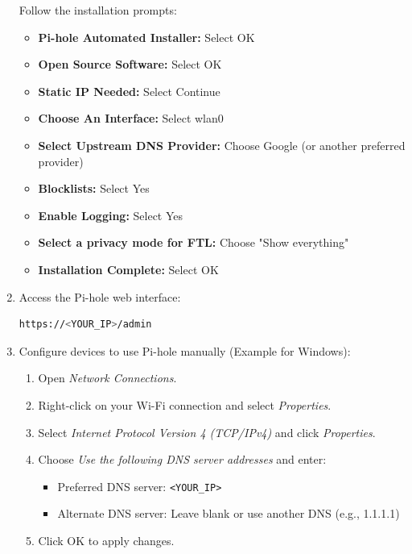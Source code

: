 \documentclass[a4paper,12pt]{article}
\begin{document}
\begin{enumerate}
    Follow the installation prompts:
    \begin{itemize}
        \item \textbf{Pi-hole Automated Installer:} Select OK
        \item \textbf{Open Source Software:} Select OK
        \item \textbf{Static IP Needed:} Select Continue
        \item \textbf{Choose An Interface:} Select wlan0
        \item \textbf{Select Upstream DNS Provider:} Choose Google (or another preferred provider)
        \item \textbf{Blocklists:} Select Yes
        \item \textbf{Enable Logging:} Select Yes
        \item \textbf{Select a privacy mode for FTL:} Choose "Show everything"
        \item \textbf{Installation Complete:} Select OK
    \end{itemize}

    \item Access the Pi-hole web interface:
    \begin{lstlisting}[language=bash, breaklines=true, breakatwhitespace=true, columns=fullflexible]
    https://<YOUR_IP>/admin
    \end{lstlisting}

    \item Configure devices to use Pi-hole manually (Example for Windows):
    \begin{enumerate}
        \item Open \textit{Network Connections}.
        \item Right-click on your Wi-Fi connection and select \textit{Properties}.
        \item Select \textit{Internet Protocol Version 4 (TCP/IPv4)} and click \textit{Properties}.
        \item Choose \textit{Use the following DNS server addresses} and enter:
        \begin{itemize}
            \item Preferred DNS server: \texttt{\textless YOUR\_IP\textgreater}
            \item Alternate DNS server: Leave blank or use another DNS (e.g., 1.1.1.1)
        \end{itemize}
        \item Click OK to apply changes.
    \end{enumerate}


\end{enumerate}
\end{document}
